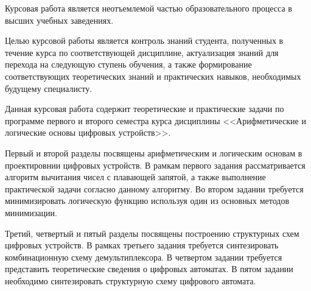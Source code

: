 
Курсовая работа является неотъемлемой частью образовательного процесса в высших учебных заведениях.

Целью курсовой работы является контроль знаний студента, полученных в течение курса по соответствующей дисциплине,
актуализация знаний для перехода на следующую ступень обучения,
а также формирование соответствующих теоретических знаний и практических навыков, необходимых будущему специалисту.

Данная курсовая работа содержит теоретические и практические задачи по программе первого и второго семестра
курса дисциплины <<Арифметические и логические основы цифровых устройств>>.

Первый и второй разделы посвящены арифметическим и логическим основам в проектировнии цифровых устройств.
В рамкам первого задания рассматривается алгоритм вычитания чисел с плавающей запятой, а также выполнение практической
задачи согласно данному алгоритму. Во втором задании требуется минимизировать логическую функцию используя один из основных
методов минимизации.

Третий, четвертый и пятый разделы посвящены построению структурных схем цифровых устройств. 
В рамках третьего задания требуется синтезировать комбинационную схему демультиплексора.
В четвертом задании требуется представить теоретические сведения о цифровых автоматах.
В пятом задании необходимо синтезировать структурную схему цифрового автомата.